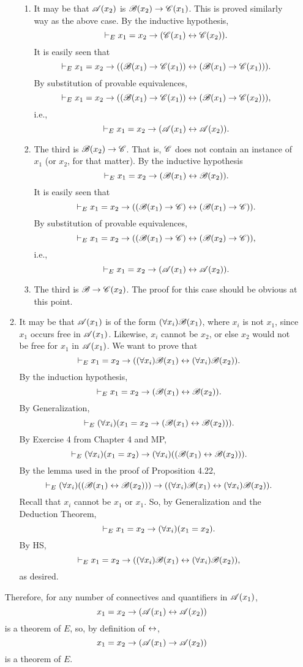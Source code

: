 \begin{enumerate}
\begin{enumerate}
\begin{enumerate}
          \item It may be that \(\mathscr{A}(x_2)\) is \(\mathscr{B}(x_2) \rightarrow \mathscr{C}(x_1)\). This is proved similarly way as the above case. By the inductive hypothesis,
            \[\vdash_{E} x_1 = x_2 \rightarrow (\mathscr{C}(x_1) \leftrightarrow \mathscr{C}(x_2)).\]
            It is easily seen that
            \[\vdash_{E} x_1 = x_2 \rightarrow ((\mathscr{B}(x_1) \rightarrow \mathscr{C}(x_1)) \leftrightarrow (\mathscr{B}(x_1) \rightarrow \mathscr{C}(x_1))).\]
            By substitution of provable equivalences,
            \[\vdash_{E} x_1 = x_2 \rightarrow ((\mathscr{B}(x_1) \rightarrow \mathscr{C}(x_1)) \leftrightarrow (\mathscr{B}(x_1) \rightarrow \mathscr{C}(x_2))),\]
            i.e.,
            \[\vdash_{E} x_1 = x_2 \rightarrow (\mathscr{A}(x_1) \leftrightarrow \mathscr{A}(x_2)).\]

          \item The third is \(\mathscr{B}(x_2) \rightarrow \mathscr{C}\). That is, \(\mathscr{C}\) does not contain an instance of \(x_1\) (or \(x_2\), for that matter). By the inductive hypothesis
            \[\vdash_{E} x_1 = x_2 \rightarrow (\mathscr{B}(x_1) \leftrightarrow \mathscr{B}(x_2)).\]
            It is easily seen that
            \[\vdash_{E} x_1 = x_2 \rightarrow ((\mathscr{B}(x_1) \rightarrow \mathscr{C}) \leftrightarrow (\mathscr{B}(x_1) \rightarrow \mathscr{C})).\]
            By substitution of provable equivalences,
            \[\vdash_{E} x_1 = x_2 \rightarrow ((\mathscr{B}(x_1) \rightarrow \mathscr{C}) \leftrightarrow (\mathscr{B}(x_2) \rightarrow \mathscr{C})),\]
            i.e.,
            \[\vdash_{E} x_1 = x_2 \rightarrow (\mathscr{A}(x_1) \leftrightarrow \mathscr{A}(x_2)).\]

          \item The third is \(\mathscr{B} \rightarrow \mathscr{C}(x_2)\). The proof for this case should be obvious at this point.
      \end{enumerate}

      \item It may be that \(\mathscr{A}(x_1)\) is of the form \((\forall x_i)\mathscr{B}(x_1)\), where \(x_i\) is not \(x_1\), since \(x_1\) occurs free in \(\mathscr{A}(x_1)\). Likewise, \(x_i\) cannot be \(x_2\), or else \(x_2\) would not be free for \(x_1\) in \(\mathscr{A}(x_1)\). We want to prove that
        \[\vdash_{E} x_1 = x_2 \rightarrow ((\forall x_i)\mathscr{B}(x_1) \leftrightarrow (\forall x_i)\mathscr{B}(x_2)).\]
        By the induction hypothesis,
        \[\vdash_{E} x_1 = x_2 \rightarrow (\mathscr{B}(x_1) \leftrightarrow \mathscr{B}(x_2)).\]
        By Generalization,
        \[\vdash_{E} (\forall x_i)(x_1 = x_2 \rightarrow (\mathscr{B}(x_1) \leftrightarrow \mathscr{B}(x_2))).\]
        By Exercise 4 from Chapter 4 and MP,
        \[\vdash_{E} (\forall x_i)(x_1 = x_2) \rightarrow (\forall x_i)((\mathscr{B}(x_1) \leftrightarrow \mathscr{B}(x_2))).\]
        By the lemma used in the proof of Proposition 4.22,
        \[\vdash_{E} (\forall x_i)((\mathscr{B}(x_1) \leftrightarrow \mathscr{B}(x_2))) \rightarrow ((\forall x_i)\mathscr{B}(x_1) \leftrightarrow (\forall x_i)\mathscr{B}(x_2)).\]
        Recall that \(x_i\) cannot be \(x_1\) or \(x_1\). So, by Generalization and the Deduction Theorem,
        \[\vdash_{E} x_1 = x_2 \rightarrow (\forall x_i)(x_1 = x_2).\]
        By HS,
        \[\vdash_{E} x_1 = x_2 \rightarrow ((\forall x_i)\mathscr{B}(x_1) \leftrightarrow (\forall x_i)\mathscr{B}(x_2)),\]
        as desired.
    \end{enumerate}
    Therefore, for any number of connectives and quantifiers in \(\mathscr{A}(x_1)\),
    \[x_1 = x_2 \rightarrow (\mathscr{A}(x_1) \leftrightarrow \mathscr{A}(x_2))\]
    is a theorem of \(E\), so, by definition of \(\leftrightarrow\),
    \[x_1 = x_2 \rightarrow (\mathscr{A}(x_1) \rightarrow \mathscr{A}(x_2))\]
    is a theorem of \(E\).


\end{enumerate}
